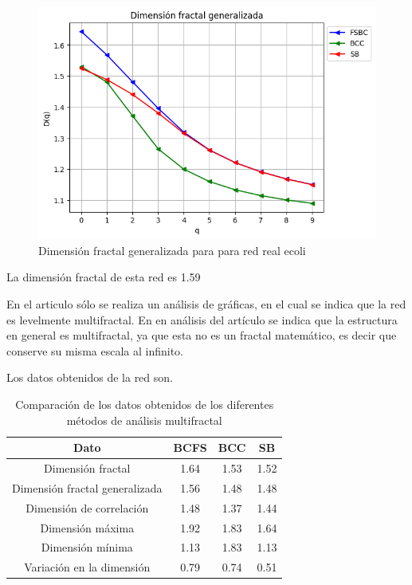 \begin{figure}[H]
    \centering
    \includegraphics[scale=0.7]{Capitulo4Multifractalidad/imagenes/a_Dqflower22.png}
    \caption{Dimensión fractal generalizada para para red real ecoli}
\end{figure}

La dimensión fractal de esta red es 1.59


En el articulo sólo se realiza un análisis de gráficas, en el cual se indica que la red es levelmente multifractal. En en análisis del artículo se indica que la estructura en general es multifractal, ya que esta no es un fractal matemático, es decir que conserve su misma escala al infinito.

Los datos obtenidos de la red son.

\begin{table}[H]
    \centering
    \begin{tabular}{|c|c|c|c|}
        \hline
         \textbf{Dato}& \textbf{BCFS} & \textbf{BCC} & \textbf{SB} \\
         \hline
         Dimensión fractal & 1.64 & 1.53 & 1.52\\
         \hline
         Dimensión fractal generalizada  & 1.56 & 1.48 & 1.48\\
         \hline
         Dimensión de correlación & 1.48 & 1.37 & 1.44\\
         \hline
         Dimensión máxima & 1.92 & 1.83 & 1.64 \\
         \hline
         Dimensión mínima & 1.13 & 1.83& 1.13 \\
         \hline
         Variación en la dimensión & 0.79 & 0.74 & 0.51 \\
         \hline
    \end{tabular}
    \caption{Comparación de los datos obtenidos de los diferentes métodos de análisis multifractal}
\end{table}